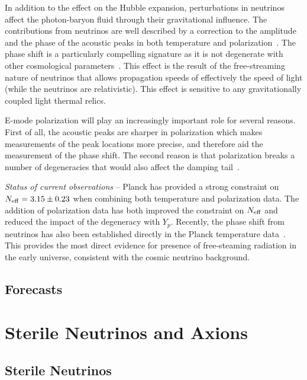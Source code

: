 In addition to the effect on the Hubble expansion, perturbations in neutrinos affect the photon-baryon fluid through their gravitational influence.  The contributions from neutrinos are well described by a correction to the amplitude and the phase of the acoustic peaks in both temperature and polarization~\cite{Bashinsky:2003tk}.  The phase shift is a particularly compelling signature as it is not degenerate with other cosmological parameters~\cite{Bashinsky:2003tk,Baumann:2015rya}.  This effect is the result of the free-streaming nature of neutrinos that allows propagation speeds of effectively the speed of light (while the neutrinos are relativistic).  This effect is sensitive to any gravitationally coupled light thermal relics.

E-mode polarization will play an increasingly important role for several reasons.  First of all, the acoustic peaks are sharper in polarization which makes measurements of the peak locations more precise, and therefore aid the measurement of the phase shift.  The second reason is that polarization breaks a number of degeneracies that would also affect the damping tail~\cite{Baumann:2015rya}.

{\it Status of current observations} -- Planck has provided a strong constraint on $N_{\rm eff} = 3.15 \pm 0.23$ when combining both temperature and polarization data.  The addition of polarization data has both improved the constraint on $N_{\rm eff}$ and reduced the impact of the degeneracy with $Y_p$.  Recently, the phase shift from neutrinos has also been established directly in the Planck temperature data~\cite{Follin:2015hya}.  This provides the most direct evidence for presence of free-steaming radiation in the early universe, consistent with the cosmic neutrino background.


\subsection{Forecasts}




\section{Sterile Neutrinos and Axions}
\subsection{Sterile Neutrinos}
\label{sec:sterile_neutrinos}

